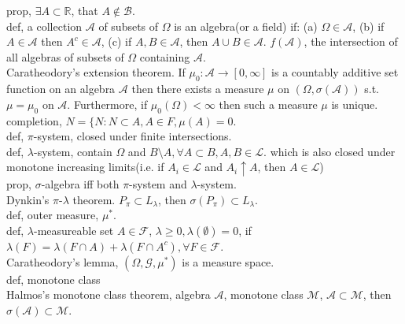 \documentclass[paper=a4, fontsize=11pt]{scrartcl} %
\numberwithin{equation}{section} %
\numberwithin{figure}{section} %
\numberwithin{table}{section} %
\begin{document}
prop, $\exists A\subset \mathbb{R}$, that $A\notin \mathcal{B}$.\\
def, a collection $\mathcal{A}$ of subsets of $\Omega$ is an algebra(or a field) if: (a) $\Omega\in\mathcal{A}$, (b) if $A\in\mathcal{A}$ then $A^c\in\mathcal{A}$, (c) if $A,B\in\mathcal{A}$, then $A\cup B\in \mathcal{A}$.
$f(\mathcal{A})$, the intersection of all algebras of subsets of $\Omega$ containing $\mathcal{A}$.\\
Caratheodory's extension theorem. If $\mu_0: \mathcal{A}\rightarrow [0,\infty]$ is a countably additive set function on an algebra $\mathcal{A}$ then there exists a measure $\mu$ on $(\Omega, \sigma(\mathcal{A}))$ s.t. $\mu=\mu_0$ on $\mathcal{A}$. Furthermore, if $\mu_0(\Omega)<\infty$ then such a measure $\mu$ is unique.\\
completion, $N=\{N:N\subset A, A\in F, \mu(A)=0$.\\
def, $\pi$-system, closed under finite intersections.\\
def, $\lambda$-system, contain $\Omega$ and $B\setminus A,\forall A\subset B,A,B\in \mathcal{L}$. which is also closed under monotone increasing limits(i.e. if $A_i\in\mathcal{L}$ and $A_i\uparrow A$, then $A\in\mathcal{L}$)\\
prop, $\sigma$-algebra iff both $\pi$-system and $\lambda$-system.\\
Dynkin's $\pi$-$\lambda$ theorem. $P_\pi \subset L_\lambda$, then $\sigma(P_\pi)\subset L_\lambda$.\\
def, outer measure, $\mu^*$.\\
def, $\lambda$-measureable set $A\in \mathcal{F}$, $\lambda\geq 0,\lambda(\emptyset)=0$, if $\lambda(F)=\lambda(F\cap A)+\lambda(F\cap A^c),\forall F\in\mathcal{F}$.\\
Caratheodory's lemma, $(\Omega, \mathcal{G},\mu^*)$ is a measure space.\\
def, monotone class\\
Halmos's monotone class theorem, algebra $\mathcal{A}$, monotone class $\mathcal{M}$, $\mathcal{A}\subset \mathcal{M}$, then $\sigma(\mathcal{A})\subset \mathcal{M}$.
\end{document}
